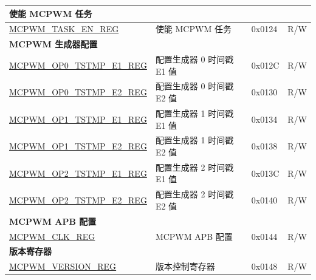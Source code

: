 \begin{longtable}{ | p{6cm} | p{7.2cm} | p{1.2cm} | p{1cm} | }
\multicolumn{4}{|l|}{\textbf{使能 MCPWM 任务}} \\ \hline
\hyperref[regdesc:MCPWMTASKENREG]{MCPWM\_TASK\_EN\_REG} & 使能 MCPWM 任务 & 0x0124 & R/W \\ \hline

\multicolumn{4}{|l|}{\textbf{MCPWM 生成器配置}} \\ \hline
\hyperref[regdesc:MCPWMOPNTSTMPE1REG]{MCPWM\_OP0\_TSTMP\_E1\_REG} & 配置生成器 0 时间戳 E1 值 & 0x012C & R/W \\ \hline
\hyperref[regdesc:MCPWMOPNTSTMPE2REG]{MCPWM\_OP0\_TSTMP\_E2\_REG} & 配置生成器 0 时间戳 E2 值 & 0x0130 & R/W \\ \hline
\hyperref[regdesc:MCPWMOPNTSTMPE1REG]{MCPWM\_OP1\_TSTMP\_E1\_REG} & 配置生成器 1 时间戳 E1 值 & 0x0134 & R/W \\ \hline
\hyperref[regdesc:MCPWMOPNTSTMPE2REG]{MCPWM\_OP1\_TSTMP\_E2\_REG} & 配置生成器 1 时间戳 E2 值 & 0x0138 & R/W \\ \hline
\hyperref[regdesc:MCPWMOPNTSTMPE1REG]{MCPWM\_OP2\_TSTMP\_E1\_REG} & 配置生成器 2 时间戳 E1 值 & 0x013C & R/W \\ \hline
\hyperref[regdesc:MCPWMOPNTSTMPE2REG]{MCPWM\_OP2\_TSTMP\_E2\_REG} & 配置生成器 2 时间戳 E2 值 & 0x0140 & R/W \\ \hline

\multicolumn{4}{|l|}{\textbf{MCPWM APB 配置}} \\ \hline
\hyperref[regdesc:MCPWMCLKREG]{MCPWM\_CLK\_REG} & MCPWM APB 配置 & 0x0144 & R/W \\ \hline

\multicolumn{4}{|l|}{\textbf{版本寄存器}} \\ \hline
\hyperref[regdesc:MCPWMVERSIONREG]{MCPWM\_VERSION\_REG} & 版本控制寄存器 & 0x0148 &  R/W \\ \hline
\end{longtable}

